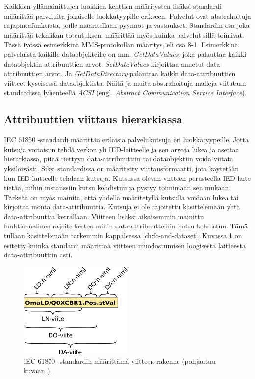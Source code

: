 Kaikkien yllämainittujen luokkien kenttien määritysten lisäksi standardi määrittää palveluita jokaiselle luokkatyypille erikseen. Palvelut ovat abstrahoituja rajapintafunktiota, joille määritellään pyynnöt ja vastaukset. Standardin osa joka määrittää tekniikan toteutuksen, määrittää myös kuinka palvelut sillä toimivat. Tässä työssä esimerkkinä MMS-protokollan määritys, eli osa 8-1. Esimerkkinä palveluista kaikille dataobjekteille on mm. \emph{GetDataValues}, joka palauttaa kaikki dataobjektin attribuuttien arvot. \emph{SetDataValues} kirjoittaa annetut data-att\-ri\-buut\-ti\-en arvot. Ja \emph{GetDataDirectory} palauttaa kaikki data-att\-ri\-buut\-ti\-en viitteet kyseisessä dataobjektista. Näitä ja muita abstrahoituja malleja viitataan standardissa lyhenteellä \emph{ACSI} (engl. \emph{Abstract Communication Service Interface}). \mbox{\cite[s.~15, 45--46]{IEC61850-7-2}} \mbox{\cite[s.~26]{IEC61850-7-1}}


\subsection{Attribuuttien viittaus hierarkiassa}
IEC 61850 -standardi määrittää erilaisia palvelukutsuja eri luokkatyypeille. Jotta kutsuja voitaisiin tehdä verkon yli IED-laitteelle ja sen arvoja lukea ja asettaa hierarkiassa, pitää tiettyyn data-attribuuttiin tai dataobjektiin voida viitata yksilöivästi. Siksi standardissa on määritetty viittausformaatti, jota käytetään kun IED-laitteelle tehdään kutsuja. Kutsussa olevan viitteen perusteella IED-laite tietää, mihin instanssiin kutsu kohdistuu ja pystyy toimimaan sen mukaan. Tärkeää on myös mainita, että yhdellä määritetyllä kutsulla voidaan lukea tai kirjoitaa monta data-attribuuttia. Kutsuja ei ole rajoitettu käsittelemään yhtä data-attribuuttia kerrallaan. Viitteen lisäksi aikaisemmin mainittu funktionaalinen rajoite kertoo mihin data-attribuutteihin kutsu kohdistuu. Tämä tullaan käsittelemään tarkemmin kappaleessa \ref{ch:fc-and-dataset}. Kuvassa \ref{fig:iec61850-data-reference} on esitetty kuinka standardi määrittää viitteen muodostumisen loogisesta laitteesta data-attribuuttiin asti. \mbox{\cite[s.~625--626]{Mackiewicz2006}}

\begin{figure}[ht!]
	\includegraphics[width=0.5\textwidth]{pictures/iec61850-data-reference.png}
	\caption{IEC 61850 -standardin määrittämä viitteen rakenne (pohjautuu kuvaan \mbox{\cite[s.~93]{IEC61850-7-1}}).}
	\label{fig:iec61850-data-reference}
\end{figure}

